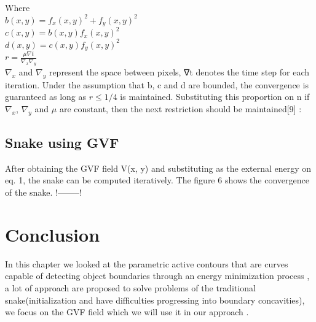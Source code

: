 Where\\
$b(x, y) = f_{x}(x, y)^{2} + f_{y}(x, y)^{2} $\\
$c(x, y) = b(x, y)f_{x}(x, y)^{2}$\\
$d(x, y) = c(x, y)f_{y}(x, y)^{2}$\\
$r = \frac{\mu \nabla t}{\nabla_{x}\nabla_{y}}$\\
$\nabla_{x}$ and $\nabla_{y}$ represent the space between pixels, ∇t denotes the time step for
each iteration.
Under the assumption that b, c and d are bounded, the convergence is
guaranteed as long as $r\leq1/4$ is maintained. Substituting this proportion on n
if $\nabla_{x}$, $\nabla_{y}$ and $\mu$ are constant, then the next restriction should be maintained[9] :

\subsection{Snake using GVF}\label{subsec:snake-using-gvf}
After obtaining the GVF field V(x, y) and substituting as the external energy on
eq. 1, the snake can be computed iteratively. The figure 6 shows the
convergence of the snake.
!--------!
\section{Conclusion}\label{sec:conclusion-ch2}
In this chapter we looked at the parametric active contours that
are curves capable of detecting object boundaries through an energy
minimization process , a lot of approach are proposed to solve problems of the
traditional snake(initialization and have difficulties progressing into boundary
concavities), we focus on the GVF field which we will use it in our approach .
